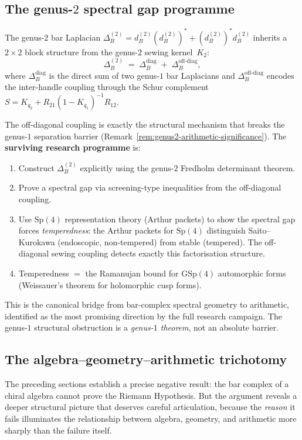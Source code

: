 \documentclass[11pt]{article}
\begin{document}
\subsection{The genus-$2$ spectral gap programme}
\label{sec:genus2-spectral-gap}

The genus-$2$ bar Laplacian
$\Delta_B^{(2)} = d_B^{(2)}(d_B^{(2)})^*
+ (d_B^{(2)})^* d_B^{(2)}$
inherits a $2 \times 2$ block structure from the genus-$2$
sewing kernel~$K_2$:
\[
  \Delta_B^{(2)}
  \;=\;
  \Delta_B^{\mathrm{diag}}
  \;+\;
  \Delta_B^{\mathrm{off\text{-}diag}},
\]
where $\Delta_B^{\mathrm{diag}}$ is the direct sum of
two genus-$1$ bar Laplacians and
$\Delta_B^{\mathrm{off\text{-}diag}}$ encodes the
inter-handle coupling through the Schur complement
$S = K_{q_2} + R_{21}(1 - K_{q_1})^{-1}R_{12}$.

The off-diagonal coupling is exactly the structural mechanism
that breaks the genus-$1$ separation barrier
(Remark~\ref{rem:genus2-arithmetic-significance}).
The \textbf{surviving research programme} is:
\begin{enumerate}[label=\textup{(\arabic*)}]
\item Construct $\Delta_B^{(2)}$ explicitly using the
  genus-$2$ Fredholm determinant theorem.
\item Prove a spectral gap via screening-type inequalities
  from the off-diagonal coupling.
\item Use $\mathrm{Sp}(4)$ representation theory
  (Arthur packets) to show the spectral gap forces
  \emph{temperedness}: the Arthur packets for
  $\mathrm{Sp}(4)$ distinguish Saito--Kurokawa
  (endoscopic, non-tempered) from stable (tempered).
  The off-diagonal sewing coupling detects exactly this
  factorisation structure.
\item Temperedness $=$ the Ramanujan bound for
  $\mathrm{GSp}(4)$ automorphic forms
  (Weissauer's theorem for holomorphic cusp forms).
\end{enumerate}
This is the canonical bridge from bar-complex spectral
geometry to arithmetic, identified as the most promising
direction by the full research campaign.
The genus-$1$ structural obstruction is a
\emph{genus-$1$ theorem}, not an absolute barrier.

\subsection{The algebra--geometry--arithmetic trichotomy}
\label{sec:algebra-geometry-arithmetic}

The preceding sections establish a precise negative result:
the bar complex of a chiral algebra cannot prove the Riemann
Hypothesis.  But the argument reveals a deeper structural
picture that deserves careful articulation, because the
\emph{reason} it fails illuminates the relationship between
algebra, geometry, and arithmetic more sharply than the
failure itself.
\end{document}
